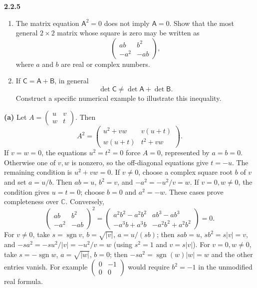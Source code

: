 \par\bigskip
\noindent\textbf{2.2.5}\quad
\begin{enumerate}
\item[(a)] The matrix equation $\mathsf{A}^{2}=0$ does not imply
  $\mathsf{A}=0$. Show that the most general $2\times2$ matrix whose square is
  zero may be written as
  \[
  \begin{pmatrix}ab&b^{2}\\-a^{2}&-ab\end{pmatrix},
  \]
  where $a$ and $b$ are real or complex numbers.
\item[(b)] If $\mathsf{C}=\mathsf{A}+\mathsf{B}$, in general
  \[
  \det\mathsf{C}\neq\det\mathsf{A}+\det\mathsf{B}.
  \]
  Construct a specific numerical example to illustrate this inequality.
\end{enumerate}
\solution
\textbf{(a)} Let $A=\begin{pmatrix}u&v\\w&t\end{pmatrix}$. Then
\[
A^2=\begin{pmatrix}u^2+vw&v(u+t)\\w(u+t)&t^2+vw\end{pmatrix}.
\]
If $v=w=0$, the equations $u^2=t^2=0$ force $A=0$,
represented by $a=b=0$. Otherwise one of $v,w$ is nonzero,
so the off-diagonal equations give $t=-u$. The remaining condition is
$u^2+vw=0$.
If $v\ne0$, choose a complex square root $b$ of $v$ and set
$a=u/b$. Then $ab=u$, $b^2=v$, and $-a^2=-u^2/v=w$.
If $v=0,w\ne0$, the condition gives $u=t=0$; choose $b=0$ and
$a^2=-w$. These cases prove completeness over $\mathbb C$.
Conversely,
\[
\begin{pmatrix}ab&b^2\\-a^2&-ab\end{pmatrix}^{\!2}
=\begin{pmatrix}
a^2b^2-a^2b^2&ab^3-ab^3\\
-a^3b+a^3b&-a^2b^2+a^2b^2
\end{pmatrix}=0.
\]
For $v\ne0$, take $s=\operatorname{sgn}v$, $b=\sqrt{|v|}$,
$a=u/(sb)$; then $sab=u$, $sb^2=s|v|=v$, and
$-sa^2=-su^2/|v|=-u^2/v=w$ (using $s^2=1$ and $v=s|v|$).
For $v=0,w\ne0$, take
$s=-\operatorname{sgn}w$, $a=\sqrt{|w|}$, $b=0$; then
$-sa^2=\operatorname{sgn}(w)|w|=w$ and the other entries vanish.
For example $\begin{pmatrix}0&-1\\0&0\end{pmatrix}$ would require
$b^2=-1$ in the unmodified real formula.

